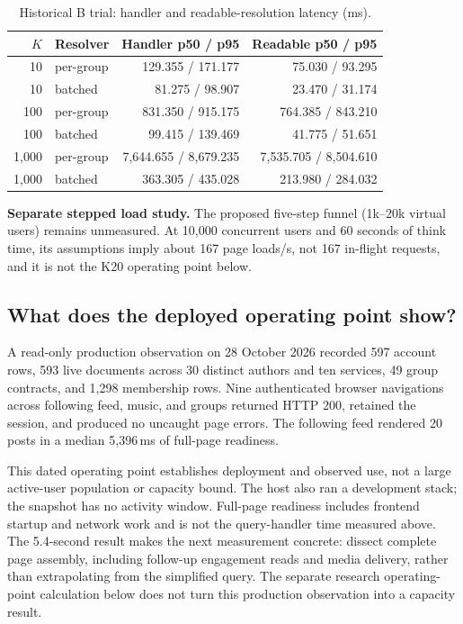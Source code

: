\documentclass[sigconf, nonacm]{acmart}
\begin{document}
\begin{table}[t]
\centering
\caption{Historical B trial: handler and readable-resolution latency (ms).}
\label{tab:fanout}
\small
\setlength{\tabcolsep}{3pt}
\begin{tabular}{rlrr}
\toprule
$K$ & Resolver & Handler p50 / p95 & Readable p50 / p95 \\
\midrule
10 & per-group & 129.355 / 171.177 & 75.030 / 93.295 \\
10 & batched & 81.275 / 98.907 & 23.470 / 31.174 \\
100 & per-group & 831.350 / 915.175 & 764.385 / 843.210 \\
100 & batched & 99.415 / 139.469 & 41.775 / 51.651 \\
1,000 & per-group & 7,644.655 / 8,679.235 & 7,535.705 / 8,504.610 \\
1,000 & batched & 363.305 / 435.028 & 213.980 / 284.032 \\
\bottomrule
\end{tabular}
\end{table}

\textbf{Separate stepped load study.} The proposed five-step funnel
(1k--20k virtual users) remains unmeasured. At 10,000 concurrent users
and 60 seconds of think time, its assumptions imply about 167 page loads/s,
not 167 in-flight requests, and it is not the K20 operating point below.



\subsection{What does the deployed operating point show?}
\label{sec:ev-production}

A read-only production observation on 28 October 2026 recorded 597
account rows, 593 live documents across 30 distinct authors and ten
services, 49 group contracts, and 1,298 membership rows. Nine
authenticated browser navigations across following feed, music, and
groups returned HTTP 200, retained the session, and produced no uncaught
page errors. The following feed rendered 20 posts in a median 5,396\,ms
of full-page readiness.

This dated operating point establishes deployment and observed use,
not a large active-user population or capacity bound. The host also ran
a development stack; the snapshot has no activity window. Full-page
readiness includes frontend startup and network work and is not the
query-handler time measured above. The 5.4-second result makes the next
measurement concrete: dissect complete page assembly, including
follow-up engagement reads and media delivery, rather than extrapolating
from the simplified query. The separate research operating-point calculation
below does not turn this production observation into a capacity result.
\end{document}
